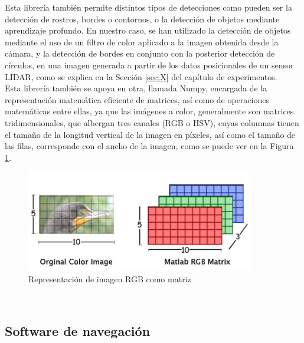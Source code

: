 Esta librería también permite distintos tipos de detecciones como pueden ser la
detección de rostros, bordes o contornos, o la detección de objetos mediante
aprendizaje profundo.
En nuestro caso, se han utilizado la detección de objetos mediante el uso de un
filtro de color aplicado a la imagen obtenida desde la cámara, y la detección de
bordes en conjunto con la posterior detección de círculos, en una imagen
generada a partir de los datos posicionales de un sensor LIDAR, como se explica
en la Sección \ref{sec:X} del capítulo de experimentos.
\\

Esta librería también se apoya en otra, llamada Numpy, encargada de la
representación matemática eficiente de matrices, así como de operaciones
matemáticas entre ellas, ya que las imágenes a color, generalmente son matrices
tridimensionales, que albergan tres canales (RGB o HSV), cuyas columnas tienen
el tamaño de la longitud vertical de la imagen en píxeles, así como el tamaño de
las filas, corresponde con el ancho de la imagen, como se puede ver en la Figura
\ref{fig:rgb_mat}.
\\

\begin{figure} [h!]
  \begin{center}
    \includegraphics[width=10cm]{figs/rgb_matrix}
  \end{center}
  \caption{Representación de imagen RGB como matriz \cite{rgb_mat}}
  \label{fig:rgb_mat}
\end{figure}\


\subsection{Software de navegación}
\label{sec:navegacion}

